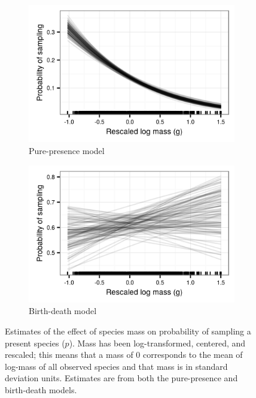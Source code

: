 \documentclass[12pt,letterpaper]{article}
\begin{document}
\begin{figure}[ht]
  \begin{subfigure}[b]{0.45\textwidth}
    \includegraphics[width=\textwidth,height=0.4\textheight,keepaspectratio=true]{figure/mass_on_samp}
    \caption{Pure-presence model}
    \label{fig:mass_preserve_pure_pres}
  \end{subfigure}
  \begin{subfigure}[b]{0.45\textwidth}
    \includegraphics[width=\textwidth,height=0.4\textheight,keepaspectratio=true]{figure/mass_on_samp_bd}
    \caption{Birth-death model}
    \label{fig:mass_preserve_bd}
  \end{subfigure}
  \caption[Estimates of the effect of mass on observation probability]{Estimates of the effect of species mass on probability of sampling a present species (\(p\)). Mass has been log-transformed, centered, and rescaled; this means that a mass of 0 corresponds to the mean of log-mass of all observed species and that mass is in standard deviation units. Estimates are from both the pure-presence and birth-death models.}
  \label{fig:mass_preserve}
\end{figure}
\end{document}
